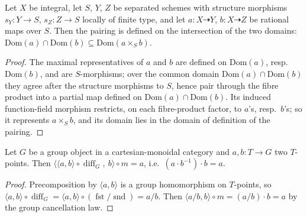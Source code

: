 \begin{lemma}\leanok
  \label{lem:rationalMap_prod_domain_bound}
  Let \(X\) be integral, let \(S\), \(Y\), \(Z\) be separated schemes with structure
  morphisms \(s_Y \colon Y \to S\), \(s_Z \colon Z \to S\) locally of finite type, and let
  \(a \colon X \dashrightarrow Y\), \(b \colon X \dashrightarrow Z\) be rational maps over
  \(S\). Then the pairing is defined on the intersection of the two domains:
  \(\mathrm{Dom}(a) \cap \mathrm{Dom}(b) \subseteq \mathrm{Dom}(a \times_S b)\).
\end{lemma}
\begin{proof}\leanok
  The maximal representatives of \(a\) and \(b\) are defined on \(\mathrm{Dom}(a)\),
  resp.\ \(\mathrm{Dom}(b)\), and are \(S\)-morphisms; over the common domain
  \(\mathrm{Dom}(a) \cap \mathrm{Dom}(b)\) they agree after the structure morphisms to
  \(S\), hence pair through the fibre product into a partial map defined on
  \(\mathrm{Dom}(a) \cap \mathrm{Dom}(b)\). Its induced function-field morphism restricts,
  on each fibre-product factor, to \(a\)'s, resp.\ \(b\)'s; so it represents \(a \times_S
  b\), and its domain lies in the domain of definition of the pairing.
\end{proof}

\begin{lemma}\leanok
  \label{lem:grpObj_reconstruction}
  Let \(G\) be a group object in a cartesian-monoidal category and \(a, b \colon T \to G\)
  two \(T\)-points. Then
  \(\bigl\langle \langle a, b\rangle \circ \operatorname{diff}_G,\ b \bigr\rangle \circ m
  = a\), i.e.\ \((a \cdot b^{-1}) \cdot b = a\).
\end{lemma}
\begin{proof}\leanok
  Precomposition by \(\langle a, b\rangle\) is a group homomorphism on \(T\)-points, so
  \(\langle a, b\rangle \circ \operatorname{diff}_G = \langle a, b\rangle \circ
  (\operatorname{fst} / \operatorname{snd}) = a / b\). Then \(\langle a/b, b\rangle \circ m
  = (a/b) \cdot b = a\) by the group cancellation law.
\end{proof}

